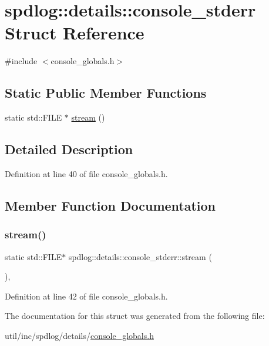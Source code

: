 \hypertarget{structspdlog_1_1details_1_1console__stderr}{}\section{spdlog\+:\+:details\+:\+:console\+\_\+stderr Struct Reference}
\label{structspdlog_1_1details_1_1console__stderr}


{\ttfamily \#include $<$console\+\_\+globals.\+h$>$}

\subsection*{Static Public Member Functions}
\begin{DoxyCompactItemize}
\item 
static std\+::\+F\+I\+LE $\ast$ \hyperlink{structspdlog_1_1details_1_1console__stderr_a7e5e8197fac999d0e215e56a3116d1fc}{stream} ()
\end{DoxyCompactItemize}


\subsection{Detailed Description}


Definition at line 40 of file console\+\_\+globals.\+h.



\subsection{Member Function Documentation}
\mbox{\label{structspdlog_1_1details_1_1console__stderr_a7e5e8197fac999d0e215e56a3116d1fc}} 
\subsubsection{\texorpdfstring{stream()}{stream()}}
{\footnotesize\ttfamily static std\+::\+F\+I\+LE$\ast$ spdlog\+::details\+::console\+\_\+stderr\+::stream (\begin{DoxyParamCaption}{ }\end{DoxyParamCaption})\hspace{0.3cm}{\ttfamily [inline]}, {\ttfamily [static]}}



Definition at line 42 of file console\+\_\+globals.\+h.



The documentation for this struct was generated from the following file\+:\begin{DoxyCompactItemize}
\item 
util/inc/spdlog/details/\hyperlink{console__globals_8h}{console\+\_\+globals.\+h}\end{DoxyCompactItemize}
